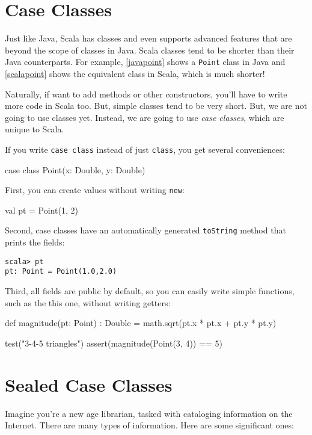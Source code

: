 \documentclass{book}
\begin{document}
\section{Case Classes}

Just like Java, Scala has classes and even supports advanced features that are
beyond the scope of classes in Java. Scala classes tend to be shorter than their
Java counterparts. For example, \cref{javapoint} shows a \verb|Point| class
in Java and \cref{scalapoint} shows the equivalent class in Scala, which
is much shorter!

Naturally, if want to add methods or other constructors, you'll have to write
more code in Scala too. But, simple classes tend to be very short.
But, we are not going to use classes yet. Instead, we are going to use
\emph{case classes}, which are unique to Scala.

If you write \verb|case class| instead of just \verb|class|, you get several
conveniences:

\begin{scalacode}
case class Point(x: Double, y: Double)
\end{scalacode}

First, you can create values without writing \verb|new|:

\begin{scalacode}
val pt = Point(1, 2)
\end{scalacode}

Second, case classes have an automatically generated \verb|toString| method that
prints the fields:

\begin{verbatim}
scala> pt
pt: Point = Point(1.0,2.0)
\end{verbatim}

Third, all fields are public by default, so you can easily write simple
functions, such as the this one, without writing getters:

\begin{scalacode}
def magnitude(pt: Point) : Double = {
  math.sqrt(pt.x * pt.x + pt.y * pt.y)
}

test("3-4-5 triangles") {
  assert(magnitude(Point(3, 4)) == 5)
}
\end{scalacode}

\section{Sealed Case Classes}

Imagine you're a new age librarian, tasked with cataloging information on the
Internet. There are many types of information. Here are some significant ones:
\end{document}
